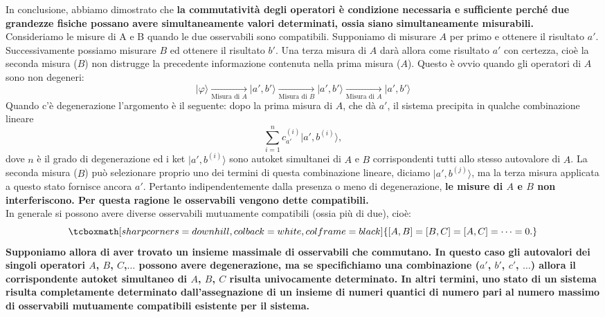 In conclusione, abbiamo dimostrato che \textbf{la commutatività degli operatori è condizione necessaria e sufficiente perché due grandezze fisiche possano avere simultaneamente valori determinati, ossia siano simultaneamente misurabili.}\\

Consideriamo le misure di A e B quando le due osservabili sono compatibili. Supponiamo di misurare $A$ per primo e ottenere il risultato $a'$. Successivamente possiamo misurare $B$ ed ottenere il risultato $b'$. Una terza misura di $A$ darà allora come risultato $a'$ con certezza, cioè la seconda misura ($B$) non distrugge la precedente informazione contenuta nella prima misura ($A$). Questo è ovvio quando gli operatori di $A$ sono non degeneri:
	\begin{equation}
		\vert \varphi \rangle \xrightarrow[\textrm{Misura di }A]{ } \vert a',b' \rangle \xrightarrow[\textrm{Misura di }B]{ } \vert a',b' \rangle \xrightarrow[\textrm{Misura di }A]{ } \vert a',b' \rangle  
	\end{equation}
Quando c'è degenerazione l'argomento  è il seguente: dopo la prima misura di $A$, che dà $a'$, il sistema precipita in qualche combinazione lineare
	\begin{equation}
		\sum _{i=1} ^n c_{a'} ^{(i)} \vert a', b^{(i)} \rangle ,
	\end{equation}
dove $n$ è il grado di degenerazione ed i ket $\vert a', b^{(i)} \rangle $ sono autoket simultanei di $A$ e $B$ corrispondenti tutti allo stesso autovalore di $A$. La seconda misura ($B$) può selezionare proprio uno dei termini di questa combinazione lineare, diciamo $\vert a', b^{(j)} \rangle $, ma la terza misura applicata a questo stato fornisce ancora $a'$. Pertanto indipendentemente dalla presenza o meno di degenerazione, \textbf{le misure di $A$ e $B$ non interferiscono. Per questa ragione le osservabili vengono dette compatibili.}\\

In generale si possono avere diverse osservabili mutuamente compatibili (ossia più di due), cioè:
	\begin{equation}
		\tcboxmath[sharp corners=downhill, colback=white, colframe=black]{
			\left[A,B\right]=\left[B,C\right]=\left[A,C\right]=\dots =0.
			}
	\end{equation}
\textbf{Supponiamo allora di aver trovato un insieme massimale di osservabili che commutano. In questo caso gli autovalori dei singoli operatori $A$, $B$, $C$,$\dots$ possono avere degenerazione, ma se specifichiamo una combinazione ($a'$, $b'$, $c'$, $\dots$) allora il corrispondente autoket simultaneo di $A$, $B$, $C$ risulta univocamente determinato. In altri termini, uno stato di un sistema risulta completamente determinato dall'assegnazione di un insieme di numeri quantici di numero pari al numero massimo di osservabili mutuamente compatibili esistente per il sistema.}
